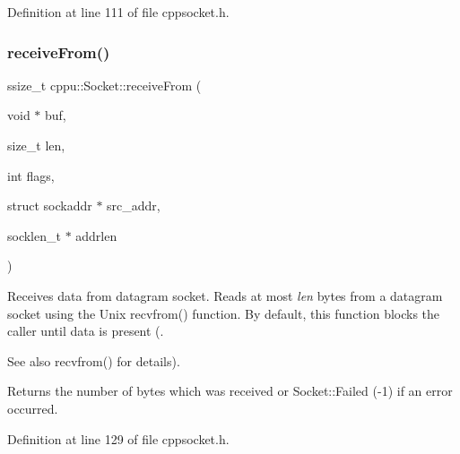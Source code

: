 Definition at line 111 of file cppsocket.\+h.


\begin{DoxyCode}{0}

\end{DoxyCode}
\mbox{\label{classcppu_1_1_socket_abd460be82deeb29e730fc83f871e51c4}} 
\subsubsection{\texorpdfstring{receiveFrom()}{receiveFrom()}}
{\footnotesize\ttfamily ssize\+\_\+t cppu\+::\+Socket\+::receive\+From (\begin{DoxyParamCaption}\item[{void $\ast$}]{buf,  }\item[{size\+\_\+t}]{len,  }\item[{int}]{flags,  }\item[{struct sockaddr $\ast$}]{src\+\_\+addr,  }\item[{socklen\+\_\+t $\ast$}]{addrlen }\end{DoxyParamCaption})\hspace{0.3cm}{\ttfamily [inline]}}



Receives data from datagram socket. Reads at most {\itshape len} bytes from a datagram socket using the Unix recvfrom() function. By default, this function blocks the caller until data is present (. 

\begin{DoxySeeAlso}{See also}
recvfrom() for details). 
\end{DoxySeeAlso}
\begin{DoxyReturn}{Returns}
the number of bytes which was received or Socket\+::\+Failed (-\/1) if an error occurred. 
\end{DoxyReturn}


Definition at line 129 of file cppsocket.\+h.


\begin{DoxyCode}{0}

\end{DoxyCode}
\mbox{\label{classcppu_1_1_socket_aeac77f859159715e2d63a5a0dc118788}} 
